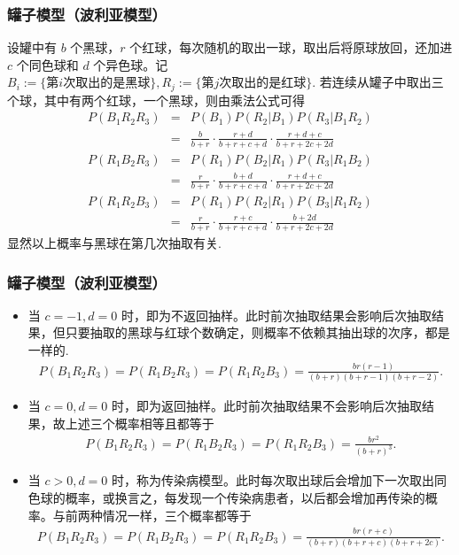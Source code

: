 \documentclass[Prob-All.tex]{subfiles}
\begin{document}
\begin{frame}
	\frametitle{罐子模型（波利亚模型）}
	\begin{exam}
		设罐中有 $b$ 个黑球，$r$ 个红球，每次随机的取出一球，取出后将原球放回，还加进 $c$ 个同色球和 $d$ 个异色球。记 $B_i:=\{\mbox{第} i\mbox{次取出的是黑球}\}, R_j:=\{\mbox{第} j\mbox{次取出的是红球}\}$. 若连续从罐子中取出三个球，其中有两个红球，一个黑球，则由乘法公式可得
		\begin{eqnarray*}
			P(B_1R_2R_3)&=&P(B_1)P(R_2|B_1)P(R_3|B_1R_2)\\
			&=&\frac{b}{b+r}\cdot\frac{r+d}{b+r+c+d}\cdot\frac{r+d+c}{b+r+2c+2d}\\
			P(R_1B_2R_3)&=&P(R_1)P(B_2|R_1)P(R_3|R_1B_2)\\
			&=&\frac{r}{b+r}\cdot\frac{b+d}{b+r+c+d}\cdot\frac{r+d+c}{b+r+2c+2d}\\
			P(R_1R_2B_3)&=&P(R_1)P(R_2|R_1)P(B_3|R_1R_2)\\
			&=&\frac{r}{b+r}\cdot\frac{r+c}{b+r+c+d}\cdot\frac{b+2d}{b+r+2c+2d}
		\end{eqnarray*}
		显然以上概率与黑球在第几次抽取有关.
	\end{exam}
\end{frame}
\begin{frame}
	\frametitle{罐子模型（波利亚模型）}
	\vspace{-0.3cm}
	\begin{itemize}[<+-|alert@+>]
		\item 当 $c=-1, d=0$ 时，即为不返回抽样。此时前次抽取结果会影响后次抽取结果，但只要抽取的黑球与红球个数确定，则概率不依赖其抽出球的次序，都是一样的.
		{\small\begin{eqnarray*}
				P(B_1R_2R_3)= P(R_1B_2R_3)=P(R_1R_2B_3)=\frac{br(r-1)}{(b+r)(b+r-1)(b+r-2)}.
		\end{eqnarray*}}
		\item 当 $c=0,d=0$ 时，即为返回抽样。此时前次抽取结果不会影响后次抽取结果，故上述三个概率相等且都等于
		{\small\begin{eqnarray*}
				P(B_1R_2R_3)= P(R_1B_2R_3)=P(R_1R_2B_3)=\frac{br^2}{(b+r)^3}.
		\end{eqnarray*}}
		\item 当 $c>0,d=0$ 时，称为传染病模型。此时每次取出球后会增加下一次取出同色球的概率，或换言之，每发现一个传染病患者，以后都会增加再传染的概率。与前两种情况一样，三个概率都等于
		{\small\begin{eqnarray*}
				P(B_1R_2R_3)= P(R_1B_2R_3)=P(R_1R_2B_3)=\frac{br(r+c)}{(b+r)(b+r+c)(b+r+2c)}.                                                        \end{eqnarray*}}

	\end{itemize}
\end{frame}
\end{document}
